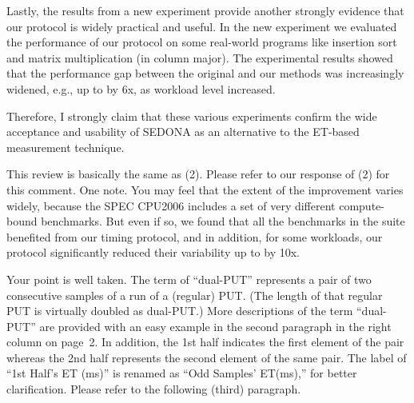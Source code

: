 \documentclass[10pt,letterpaper]{article}
\newenvironment{myindentpar}[1]%
{\begin{list}{}
         {\vspace{10pt}
					\setlength{\leftmargin}{#1}}
          \item[]
}
{\end{list}}
\newcommand{\rev}[1]{\begin{myindentpar}{.25in} {\em {\color{blue}{#1}}}\end{myindentpar}}
\begin{document}
Lastly, the results from a new experiment provide 
another strongly evidence that our protocol is widely practical and useful. 
In the new experiment we evaluated the performance of our protocol 
on some real-world programs like insertion sort and matrix multiplication (in column major). 
The experimental results showed that the performance gap between the original and our methods 
was increasingly widened, e.g., up to by 6x, as workload level increased. 

Therefore, I strongly claim that these various experiments confirm 
the wide acceptance and usability of SEDONA as an alternative to the ET-based measurement technique. 

\rev{ 
(3) The improvement of the SEDONA is little. And the extent of the each
benchmark’s improvement described in Table 3 varies widely. Thus, the
experimental results does not confirm whether the SEDONA is widely
practical or is useful.
}

This review is basically the same as (2). Please refer to our response of (2) for this comment. 
One note. You may feel that the extent of the improvement varies widely, 
because the SPEC CPU2006 includes a set of very different compute-bound benchmarks. 
But even if so, we found that all the benchmarks in the suite benefited from our timing protocol, 
and in addition, for some workloads, our protocol significantly reduced their variability up to by 10x.  


\rev{ 
(4) Since the explanation of ``dual-PUT'' is not enough, I can not well
understand the algorithm shown in Fig. 3. Similarly, what is “1st
Half’s ET (ms)” attached at Fig. 4(b), 4(c), 4(d) ? I understood only that
the label is related with “dual-PUT”. These words are important in the
manuscript. So, please keep in mind to write understandably.
}

Your point is well taken. 
The term of ``dual-PUT'' represents 
a pair of two consecutive samples of a run of a (regular) PUT. 
(The length of that regular PUT is virtually doubled as dual-PUT.) More descriptions of the term ``dual-PUT'' are provided with an easy example 
in the second paragraph in the right column on page~2. 
In addition, the 1st half indicates the first element of the pair 
whereas the 2nd half represents the second element of the same pair. 
The label of ``1st Half's ET (ms)'' is renamed as ``Odd Samples' ET(ms),'' 
for better clarification. Please refer to the following (third) paragraph. 
\end{document}
